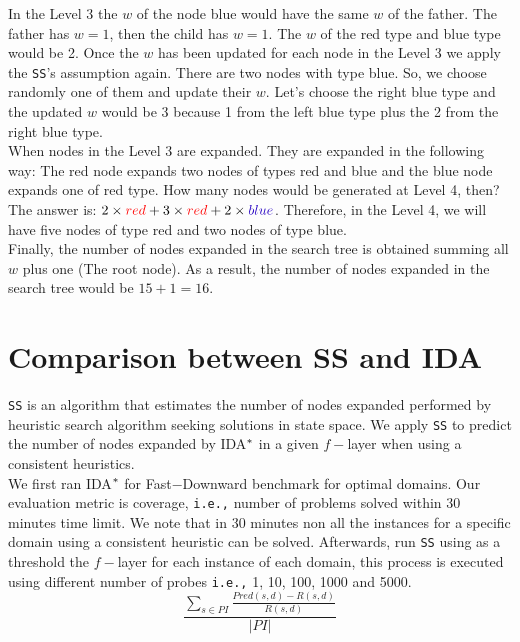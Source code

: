 In the Level 3 the $w$ of the node blue would have the same $w$ of the father. The father has $w = 1$, then the child has $w = 1$. The $w$ of the red type and blue type would be 2. Once the $w$ has been updated for each node in the Level 3 we apply the \texttt{SS}'s assumption again. There are two nodes with type blue. So, we choose randomly one of them and update their $w$. Let's choose the right blue type and the updated $w$ would be 3 because 1 from the left blue type plus the 2 from the right blue type.\\

When nodes in the Level 3 are expanded. They are expanded in the following way: The red node expands two nodes of types red and blue and the blue node expands one of red type. How many nodes would be generated at Level 4, then? The answer is: $2 \times \textcolor{red}{red} + 3 \times \textcolor{red}{red} + 2 \times \textcolor{blue}{blue}$. Therefore, in the Level 4, we will have five nodes of type red and two nodes of type blue.\\

Finally, the number of nodes expanded in the search tree is obtained summing all $w$ plus one (The root node). As a result, the number of nodes expanded in the search tree would be $ 15 + 1 = 16$.\\

\section{Comparison between SS and IDA}
\noindent
\texttt{SS} is an algorithm that estimates the number of nodes expanded performed by heuristic search algorithm seeking solutions in state space. We apply \texttt{SS} to predict the number of nodes expanded by IDA$\sp{*}$ in a given $f-$layer when using a consistent heuristics.\\

We first ran IDA$\sp{*}$ for Fast$-$Downward benchmark for optimal domains. Our evaluation metric is coverage, \texttt{i.e.,} number of problems solved within 30 minutes time limit. We note that in 30 minutes non all the instances for a specific domain using a consistent heuristic can be solved. Afterwards, run \texttt{SS} using as a threshold the $f-$layer for each instance of each domain, this process is executed using different number of probes \texttt{i.e.,} 1, 10, 100, 1000 and 5000.\\

\begin{equation}
\frac{\sum_{s\in PI} \frac{Pred(s, d) - R(s, d)}{R(s, d)}}{|PI|}
\label{eq:eq_comparison}
\end{equation}

